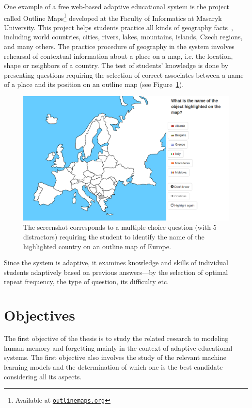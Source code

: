 One example of a free web-based adaptive educational system is the project called Outline Maps\footnote{Available at \href{http://outlinemaps.org}{\texttt{outlinemaps.org}}} developed at the Faculty of Informatics at Masaryk University. This project helps students practice all kinds of geography facts~\cite{Papousek2014}, including world countries, cities, rivers, lakes, mountains, islands, Czech regions, and many others. The practice procedure of geography in the system involves rehearsal of contextual information about a place on a map, i.e. the location, shape or neighbors of a country. The test of students' knowledge is done by presenting questions requiring the selection of correct associates between a name of a place and its position on an outline map (see Figure~\ref{fig:slepemapy}).

\begin{figure}[htbp]
  \centering
  \includegraphics[width=\textwidth]{img/slepemapy}
  \caption{The screenshot corresponds to a multiple-choice question (with 5 distractors) requiring the student to identify the name of the highlighted country on an outline map of Europe.}
  \label{fig:slepemapy}
\end{figure}

Since the system is adaptive, it examines knowledge and skills of individual students adaptively based on previous answers---by the selection of optimal repeat frequency, the type of question, its difficulty etc.

\section{Objectives}

The first objective of the thesis is to study the related research to modeling human memory and forgetting mainly in the context of adaptive educational systems. The first objective also involves the study of the relevant machine learning models and the determination of which one is the best candidate considering all its aspects.

